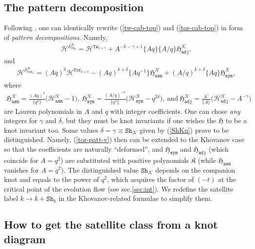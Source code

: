 \documentclass[11pt]{article}
\def\be{\begin{eqnarray}}
\def\ee{\end{eqnarray}}
\def\nn{\nonumber}
\def\Hm{\mathcal{H}}
\def\Km{\mathcal{K}}
\def\Sm{\mathcal{S}}
\def\Hfr{\mathfrak{H}}
\def\Kfr{\mathfrak{K}}
\def\Tor{\mathtt{Tor}}
\def\Tw{\mathtt{Tw}}
\def\Sh{\mathtt{Sh}}
\def\sym{\mathtt{sym}}
\def\asm{\mathtt{asm}}
\def\adj{\mathtt{adj}}
\begin{document}
\subsection{The pattern decomposition\label{sec:unsat}}
Following \cite{MorTwSat}, one can identically rewrite (\ref{tw-cab-top}) and (\ref{tor-cab-top}) in form of \textit{pattern decompositions}. Namely,
\be
\Hm^{\Sm_{\Tw_k}^{\Km}}=\Hm^{\Tw_{k+\gamma}}+A^{-k-\gamma+1}\{Aq\}\{A/q\}\Hfr^{\Km}_{\adj},\label{tw-patt-v}
\ee
and
\be
\Hm^{\Sm_{\Tor_k}^{\Km}}=\left(Aq\right)^{\delta}\Hm^{\Tor_{k+\delta}}-(Aq)^{k+\delta}\{Aq^{-1}\}\Hfr^{\Km}_{\asm}+(A/q)^{k+\delta}\{Aq\}\Hfr^{\Km}_{\sym},
\label{tor-patt-v}
\ee
where
\be
\Hfr^{\Km}_{\asm}\!=\!\frac{\left(Aq\right)^{\delta}}{\{q^2\}}\Big(\Hm^{\Km}_{\asm}-1\Big),\  \Hfr^{\Km}_{\sym}\!=\!\frac{(A/q)^{-\delta}}{\{q^2\}}\Big(\Hm^{\Km}_{\sym}-q^{2\delta}\Big), %
\ \text{and}\ \Hfr^{\Km}_{\adj}\!=\!\frac{A^{\gamma}}{\{A\}}\Big(\Hm^{\Km}_{\adj}-A^{-\gamma}\Big)
\ee
are Lauren polynomials in $A$ and $q$ with integer coefficients.
One can chose \textit{any} integers for $\gamma$ and $\delta$, but they must be knot invariants if one wishes the $\Hfr$ to be a knot invariant too. Some values $\delta=\gamma\equiv\Sh_{\Km}$ given by (\ref{ShKn}) prove to be distinguished. Namely, (\ref{tor-patt-v}) then can be extended to the Khovanov case so that the coefficients are naturally ``deformed'', and $\Hfr_{\sym}$ and $\Hfr_{\adj}$ (which coincide for $A=q^2$) are substituted with positive polynomials $\Kfr$ (while $\Hfr_{\asm}$ vanishes for $A=q^2$). The distinguished value $\Sh_{\Km}$ depends on the companion knot and equals to the power of $q^2$, which acquires the factor of $(-t)$ at the critical point of the evolution flow (see sec.\ref{sec:int}). We redefine the satellite label $k\rightarrow k+\Sh_k$ in the Khovanov-related formulae to simplify them.


\subsection{How to get the satellite class from a knot diagram\label{sec:sat}}
\end{document}
